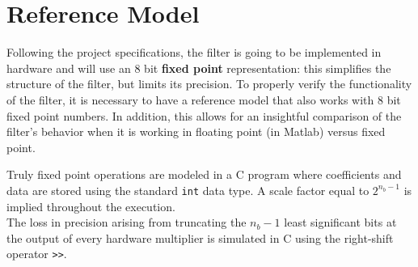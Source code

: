 \section{Reference Model}
Following the project specifications, the filter is going to be implemented in hardware and will use an 8 bit \textbf{fixed point} representation: this simplifies the structure of the filter, but limits its precision.
To properly verify the functionality of the filter, it is necessary to have a reference model that also works with 8 bit fixed point numbers. In addition, this allows for an insightful comparison of the filter's behavior when it is working in floating point (in Matlab) versus fixed point.

Truly fixed point operations are modeled in a C program where coefficients and data are stored using the standard \texttt{int} data type. A scale factor equal to $2^{n_b-1}$ is implied throughout the execution.\\
The loss in precision arising from truncating the $n_b-1$ least significant bits at the output of every hardware multiplier is simulated in C using the right-shift operator \texttt{>>}.
